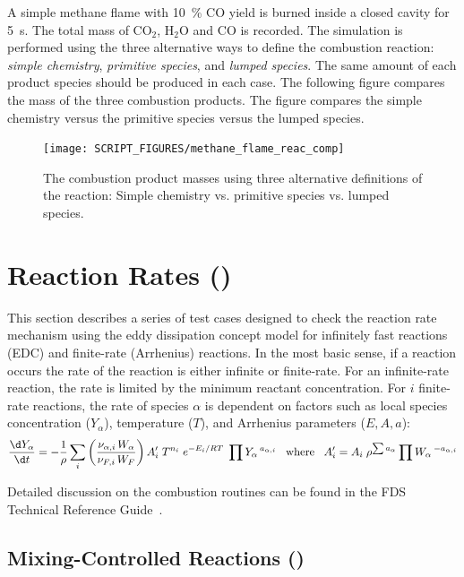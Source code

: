 \documentclass[11pt]{book}
\begin{document}
A simple methane flame with 10~\% CO yield is burned inside a closed cavity for 5~s.
The total mass of CO$_2$, H$_2$O and CO is recorded.
The simulation is performed using the three alternative ways
to define the combustion reaction: {\em simple chemistry}, {\em primitive species}, and {\em lumped species}. The
same amount of each product species should be produced in each case. The following figure compares the
mass of the three combustion products. The figure compares the simple chemistry versus the primitive species versus the lumped species.
\begin{figure}[ht]
\centering
\texttt{[image: SCRIPT\_FIGURES/methane\_flame\_reac\_comp]}
\caption[Yield of combustion products for alternative reactions]{The combustion product masses using three alternative definitions of the reaction:  Simple chemistry vs. primitive species vs. lumped species. }
\label{fig_methane_flame_yields}
\end{figure}


\section{Reaction Rates (\texorpdfstring{}{reactionrate})}

This section describes a series of test cases designed to check the reaction rate mechanism using the eddy dissipation concept model for infinitely fast reactions (EDC) and  finite-rate (Arrhenius) reactions. In the most basic sense, if a reaction occurs the rate of the reaction is either infinite or finite-rate. For an infinite-rate reaction, the rate is limited by the minimum reactant concentration. For $i$ finite-rate reactions, the rate of species $\alpha$ is dependent on factors such as local species concentration ($Y_{\alpha}$), temperature ($T$), and Arrhenius parameters ($E,A,a$):
\begin{equation}\label{eq:finite_rate1}
\frac{\d Y_{\alpha}}{\d t} = -\frac{1}{\rho}\sum_{i} \left(\frac{\nu_{\alpha,i}\,W_{\alpha}}{\nu_{F,i}\,W_{F}}\right)A_i^{\prime}\;T^{n_i}\;e^{-E_i/RT}\;\prod Y_{\alpha}\,^{a_{\alpha,i}} \;\;\; \text{where} \;\;\; A^{\prime}_{i} = A_{i}\;\rho^{\sum a_{\alpha}}\prod W_{\alpha}\,^{-a_{\alpha,i}}
\end{equation}

Detailed discussion on the combustion routines can be found in the FDS Technical Reference Guide~\cite{FDS_Tech_Guide}.

\subsection{Mixing-Controlled Reactions (\texorpdfstring{}{reactionrate\_EDC})}
\label{mixing_reactions}
\label{reactionrate_EDC_flim_1step_CH4}
\label{reactionrate_EDC_flim_1step_C3H8}
\label{reactionrate_EDC_1step_CH4_nonmix}
\label{reactionrate_EDC_O2lim_1step}
\label{reactionrate_EDC_O2lim_2fuel}
\label{reactionrate_series_reaction}
\label{reactionrate_EDC_flim_2step}
\label{reactionrate_lumped_two_air}
\end{document}
